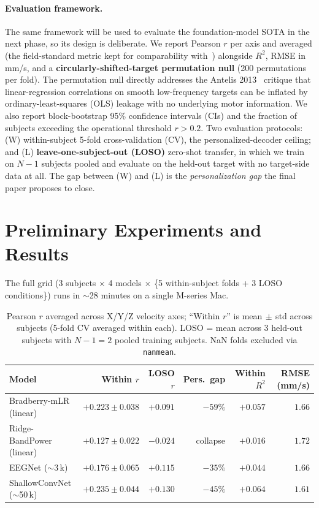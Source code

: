 \documentclass{article}
\begin{document}
\paragraph{Evaluation framework.} The same framework will be used to evaluate the foundation-model SOTA in the next phase, so its design is deliberate. We report Pearson $r$ per axis and averaged (the field-standard metric kept for comparability with~\cite{bradberry2010,mondini2020,borra2023}) alongside $R^2$, RMSE in mm/s, and a \textbf{circularly-shifted-target permutation null} (200 permutations per fold). The permutation null directly addresses the Antelis 2013~\cite{antelis2013} critique that linear-regression correlations on smooth low-frequency targets can be inflated by ordinary-least-squares (OLS) leakage with no underlying motor information. We also report block-bootstrap 95\% confidence intervals (CIs) and the fraction of subjects exceeding the operational threshold $r > 0.2$. Two evaluation protocols: (W) within-subject 5-fold cross-validation (CV), the personalized-decoder ceiling; and (L) \textbf{leave-one-subject-out (LOSO)} zero-shot transfer, in which we train on $N{-}1$ subjects pooled and evaluate on the held-out target with no target-side data at all. The gap between (W) and (L) is the \emph{personalization gap} the final paper proposes to close.

\section{Preliminary Experiments and Results}

The full grid (3 subjects $\times$ 4 models $\times$ \{5 within-subject folds + 3 LOSO conditions\}) runs in $\sim$28 minutes on a single M-series Mac.

\begin{table}[h]
\centering
\footnotesize
\setlength{\tabcolsep}{4pt}
\begin{tabular}{lrrrrr}
\toprule
Model & Within $r$ & LOSO $r$ & Pers.\ gap & Within $R^2$ & RMSE (mm/s) \\
\midrule
Bradberry-mLR (linear)         & $+0.223 \pm 0.038$ & $+0.091$ & $-59\%$ & $+0.057$ & $1.66$ \\
Ridge-BandPower (linear)       & $+0.127 \pm 0.022$ & $-0.024$ & collapse & $+0.016$ & $1.72$ \\
EEGNet ($\sim$3\,k)            & $+0.176 \pm 0.065$ & $+0.115$ & $-35\%$ & $+0.044$ & $1.66$ \\
ShallowConvNet ($\sim$50\,k)   & $\mathbf{+0.235 \pm 0.044}$ & $\mathbf{+0.130}$ & $-45\%$ & $+0.064$ & $1.61$ \\
\bottomrule
\end{tabular}
\caption{Pearson $r$ averaged across X/Y/Z velocity axes; ``Within $r$'' is mean$\,\pm\,$std across subjects (5-fold CV averaged within each). LOSO = mean across 3 held-out subjects with $N{-}1{=}2$ pooled training subjects. NaN folds excluded via \texttt{nanmean}.}
\label{tab:headline}
\end{table}
\end{document}
